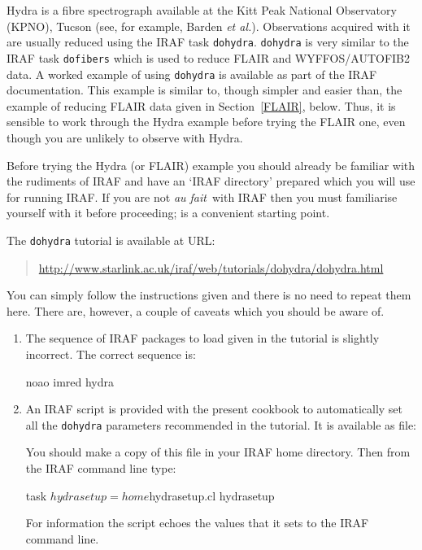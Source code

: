 \documentclass[chapters,twoside,11pt]{starlink}
\begin{document}
Hydra is a fibre spectrograph available at the Kitt Peak National
Observatory (KPNO), Tucson (see, for example, Barden \textit{et
al.}\/\cite{BARDEN93}).  Observations acquired with it are usually
reduced using the IRAF task \texttt{dohydra}.  \texttt{dohydra} is very
similar to the IRAF task \texttt{dofibers} which is used to reduce
FLAIR and WYFFOS/AUTOFIB2 data.  A worked example of using \texttt{dohydra} is available as part of the IRAF documentation.  This example
is similar to, though simpler and easier than, the example of reducing
FLAIR data given in Section~\ref{FLAIR}, below.  Thus, it is sensible to
work through the Hydra example before trying the FLAIR one, even though
you are unlikely to observe with Hydra.

Before trying the Hydra (or FLAIR) example you should already be familiar
with the rudiments of IRAF and have an `IRAF directory' prepared which
you will use for running IRAF.  If you are not \textit{au fait}\, with
IRAF then you must familiarise yourself with it before proceeding;
\/\cite{SG12}
is a convenient starting point.

The \texttt{dohydra} tutorial is available at URL:

\begin{quote}
\url{http://www.starlink.ac.uk/iraf/web/tutorials/dohydra/dohydra.html}
\end{quote}

You can simply follow the instructions given and there is no need to
repeat them here.  There are, however, a couple of caveats which
you should be aware of.

\begin{enumerate}

  \item The sequence of IRAF packages to load given in the tutorial
   is slightly incorrect.  The correct sequence is:

\begin{terminalv}
noao
imred
hydra
\end{terminalv}

  \item An IRAF script is provided with the present cookbook to
   automatically set all the \texttt{dohydra} parameters recommended in
   the tutorial.  It is available as file:

\begin{terminalv}
/star/examples/sc14/hydra/hydrasetup.cl}
\end{terminalv}

   You should make a copy of this file in your IRAF home directory.
   Then from the IRAF command line type:

\begin{terminalv}
task  $hydrasetup=home$hydrasetup.cl
hydrasetup
\end{terminalv}

   For information the script echoes the values that it sets to the
   IRAF command line.

\end{enumerate}
\end{document}

